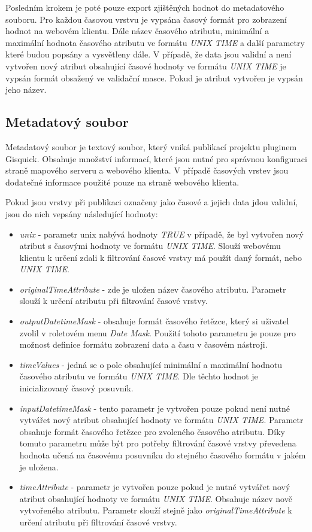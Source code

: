 Posledním krokem je poté pouze export zjištěných hodnot do metadatového souboru. Pro každou časovou vrstvu je vypsána časový formát pro zobrazení hodnot na webovém klientu. Dále název časového atributu, minimální a maximální hodnota časového atributu ve formátu \textit{UNIX TIME} a další parametry které budou popsány a vysvětleny dále. V případě, že data jsou validní a není vytvořen nový atribut obsahující časové hodnoty ve formátu \textit{UNIX TIME} je vypsán formát obsažený ve validační masce. Pokud je atribut vytvořen je vypsán jeho název.


\subsection{Metadatový soubor}

Metadatový soubor je textový soubor, který vniká publikací projektu pluginem Gisquick. Obsahuje množství informací, které jsou nutné pro správnou konfiguraci straně mapového serveru a webového klienta. V případě časových vrstev jsou dodatečné informace použité pouze na straně webového klienta. 

Pokud jsou vrstvy při publikaci označeny jako časové a jejich data jdou validní, jsou do nich vepsány následující hodnoty:

\begin{itemize}
	\item\textit{unix} - parametr unix nabývá hodnoty \textit{TRUE} v případě, že byl vytvořen nový atribut s časovými hodnoty ve formátu \textit{UNIX TIME}. Slouží webovému klientu k určení zdali k filtrování časové vrstvy má použít daný formát, nebo \textit{UNIX TIME}.
	\item\textit{originalTimeAttribute} - zde je uložen název časového atributu. Parametr slouží k určení atributu při filtrování časové vrstvy. 
	\item\textit{outputDatetimeMask} - obsahuje formát časového řetězce, který si uživatel zvolil v roletovém menu \textit{Date Mask}. Použití tohoto parametru je pouze pro možnost definice formátu zobrazení data a času v časovém nástroji.
	\item\textit{timeValues} - jedná se o pole obsahující minimální a maximální hodnotu časového atributu ve formátu \textit{UNIX TIME}. Dle těchto hodnot je inicializovaný časový posuvník. 
	\item\textit{inputDatetimeMask} - tento parametr je vytvořen pouze pokud není nutné vytvářet nový atribut obsahující hodnoty ve formátu \textit{UNIX TIME}. Parametr obsahuje formát časového řetězce pro zvoleného časového atributu. Díky tomuto parametru může být pro potřeby filtrování časové vrstvy převedena hodnota učená na časovému posuvníku do stejného časového formátu v jakém je uložena. 
	\item\textit{timeAttribute} - parametr je vytvořen pouze pokud je nutné vytvářet nový atribut obsahující hodnoty ve formátu \textit{UNIX TIME}. Obsahuje název nově vytvořeného atributu. Parametr slouží stejně jako \textit{originalTimeAttribute} k určení atributu při filtrování časové vrstvy.  
\end{itemize}

